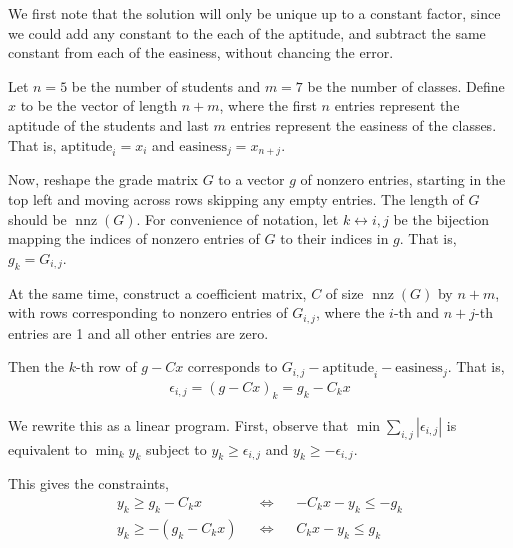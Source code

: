 \documentclass[10pt]{article}
\begin{document}
\begin{solution}[Solution]

    We first note that the solution will only be unique up to a constant factor, since we could add any constant to the each of the aptitude, and subtract the same constant from each of the easiness, without chancing the error.

    Let \( n = 5 \) be the number of students and \( m = 7 \) be the number of classes. Define \( x \) to be the vector of length \( n+m \), where the first \( n \) entries represent the aptitude of the students and last \( m \) entries represent the easiness of the classes. That is, \( \text{aptitude}_i = x_i \) and \( \text{easiness}_j = x_{n+j} \).

    Now, reshape the grade matrix \( G \) to a vector \( g \) of nonzero entries, starting in the top left and moving across rows skipping any empty entries. The length of \( G \) should be \( \operatorname{nnz}(G) \). For convenience of notation, let \( k\leftrightarrow i,j \) be the bijection mapping the indices of nonzero entries of \( G \) to their indices in \( g \). That is, \( g_k = G_{i,j} \).
    
    At the same time, construct a coefficient matrix, \( C \) of size \( \operatorname{nnz}(G) \) by \( n+m \), with rows corresponding to nonzero entries of \( G_{i,j} \), where the \( i \)-th and \( n+j \)-th entries are 1 and all other entries are zero.

    Then the \( k \)-th row of \( g - Cx \) corresponds to \( G_{i,j} - \text{aptitude}_i - \text{easiness}_j \). That is,
    \begin{align*}
        \epsilon_{i,j} = (g-Cx)_k = g_k - C_k x
    \end{align*}

    We rewrite this as a linear program. First, observe that \( \min \sum_{i,j}^{} |\epsilon_{i,j}| \) is equivalent to \( \min_k y_k \) subject to \( y_k \geq \epsilon_{i,j} \) and \( y_k \geq -\epsilon_{i,j} \).

    This gives the constraints,
    \begin{align*}
        y_k \geq g_k - C_kx 
        && \Leftrightarrow &&
        -C_k x - y_k\leq -g_k \\
        y_k \geq -(g_k - C_kx) 
        && \Leftrightarrow &&
        C_kx - y_k \leq g_k
    \end{align*}
    

\end{solution}
\end{document}
